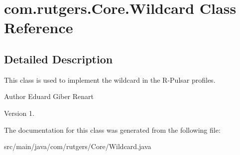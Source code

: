 \hypertarget{classcom_1_1rutgers_1_1Core_1_1Wildcard}{}\section{com.\+rutgers.\+Core.\+Wildcard Class Reference}
\label{classcom_1_1rutgers_1_1Core_1_1Wildcard}


\subsection{Detailed Description}
This class is used to implement the wildcard in the R-\/\+Pulsar profiles.

\begin{DoxyAuthor}{Author}
Eduard Giber Renart 
\end{DoxyAuthor}
\begin{DoxyVersion}{Version}
1. 
\end{DoxyVersion}


The documentation for this class was generated from the following file\+:\begin{DoxyCompactItemize}
\item 
src/main/java/com/rutgers/\+Core/Wildcard.\+java\end{DoxyCompactItemize}
